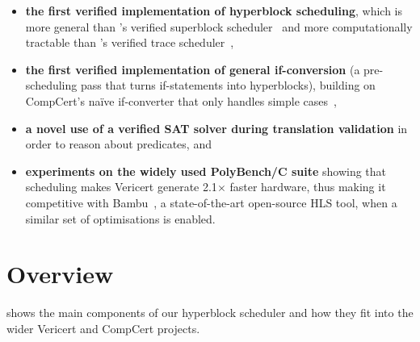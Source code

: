 \begin{itemize}
\item \textbf{the first verified implementation of hyperblock scheduling}, which
  is more general than \citeauthor{six22_formal_verif_super_sched}'s verified
  superblock scheduler~\cite{six22_formal_verif_super_sched} and more
  computationally tractable than
  \citeauthor{tristan08_formal_verif_trans_valid}'s verified trace
  scheduler~\cite{tristan08_formal_verif_trans_valid},
\item \textbf{the first verified implementation of general if-conversion} (a
  pre-scheduling pass that turns if-statements into hyperblocks), building on
  CompCert's na\"ive if-converter that only handles simple
  cases~\cite{absint19_compc},
\item \textbf{a novel use of a verified SAT solver during translation
    validation} in order to reason about predicates, and
\item \textbf{experiments on the widely used PolyBench/C suite} showing that
  scheduling makes Vericert generate 2.1$\times$ faster hardware, thus making it
  competitive with Bambu~\cite{ferrandi21_bambu}, a state-of-the-art
  open-source HLS tool, when a similar set of optimisations is enabled.
\end{itemize}

\section{Overview}
\label{sec:hs:overview}

 shows the main components of our hyperblock scheduler
and how they fit into the wider Vericert and CompCert projects.

